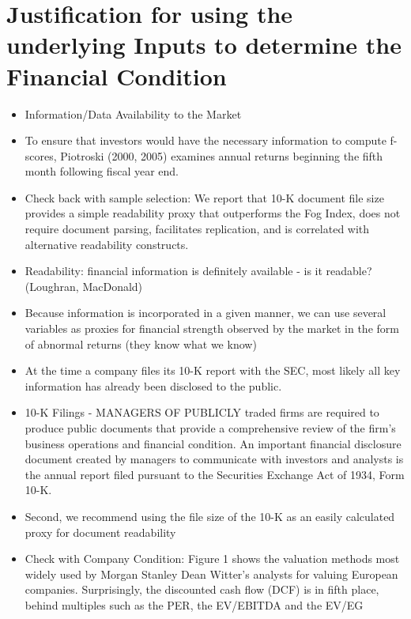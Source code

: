 \documentclass[12pt]{article}
\begin{document}
\section{Justification for using the underlying Inputs to determine the Financial Condition}

    \begin{itemize}

        \item Information/Data Availability to the Market
        
        \item To ensure that investors would have the necessary information to compute f-scores, Piotroski (2000, 2005) examines annual returns beginning the fifth month following fiscal year end. \citep{Choi2012}
        
        \item Check back with sample selection: We report that 10-K document file size provides a simple readability proxy that outperforms the Fog Index, does not require document parsing, facilitates replication, and is correlated with alternative readability constructs.\citep{Loughran2014}

        \item Readability: financial information is definitely available - is it readable? (Loughran, MacDonald)
        
        \item Because information is incorporated in a given manner, we can use several variables as proxies for financial strength observed by the market in the form of abnormal returns (they know what we know)
        
        \item At the time a company files its 10-K report with the SEC, most likely all key information has already been disclosed to the public.\citep{You2009}
        
        \item 10-K Filings - MANAGERS OF PUBLICLY traded firms are required to produce public documents that provide a comprehensive review of the firm’s business operations and financial condition. An important financial disclosure document created by managers to communicate with investors and analysts is the annual report filed pursuant to the Securities Exchange Act of 1934, Form 10-K.\citep{Loughran2014}

        \item Second, we recommend using the file size of the 10-K as an easily calculated proxy for document readability \citep{Loughran2014}

        \item Check with Company Condition: Figure 1 shows the valuation methods most widely used by Morgan Stanley Dean Witter’s analysts for valuing European companies. Surprisingly, the discounted cash flow (DCF) is in fifth place, behind multiples such as the PER, the EV/EBITDA and the EV/EG \citep{Fernandez2001}
        
    \end{itemize}
\end{document}
